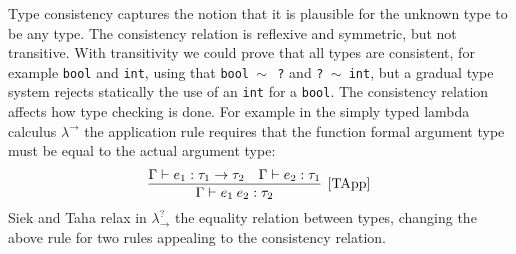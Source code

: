 \documentclass{article}
\newcommand\stlc[0]{$\lambda^{\rightarrow}$}
\newcommand\gstlc[0]{$\lambda^?_{\rightarrow}$}
\newcommand\rulename[1]{\mathrm{\text{[#1]}}}
\newcommand\icode[1]{\texttt{#1}}
\begin{document}
Type consistency captures the notion that it is plausible for the unknown type to be any type. The consistency relation is reflexive and symmetric, but not transitive. With transitivity we could prove that all types are consistent, for example \icode{bool} and \icode{int}, using that \icode{bool $\sim \:$ ?} and \icode{? $\sim$ int}, but a gradual type system rejects statically the use of an \icode{int} for a \icode{bool}.
The consistency relation affects how type checking is done. For example in the simply typed lambda calculus \stlc \: the application rule requires that the function formal argument type must be equal to the actual argument type:
\[
\infer[\rulename{TApp}] 
{\Gamma \vdash e_1 \: e_2 : \tau_2 }
{\Gamma \vdash e_1 : \tau_1 \rightarrow \tau_2 \quad 
\Gamma \vdash e_2: \tau_1}
\]
Siek and Taha relax in \gstlc \: the equality relation between types, changing the above rule for two rules appealing to the consistency relation.
\end{document}
